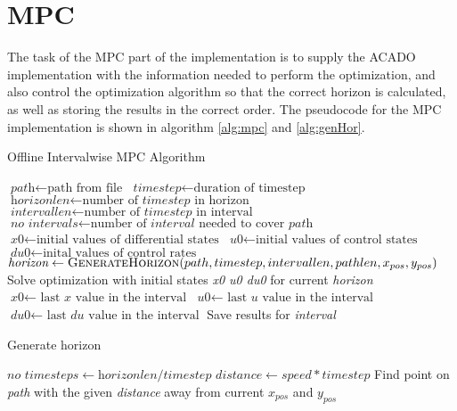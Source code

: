 \section{MPC}

The task of the MPC part of the implementation is to supply the ACADO implementation with the information needed to perform the optimization, and also control the optimization algorithm so that the correct horizon is calculated, as well as storing the results in the correct order. The pseudocode for the MPC implementation is shown in algorithm \ref{alg:mpc} and \ref{alg:genHor}.

\begin{algorithm}
\caption{Offline Intervalwise MPC Algorithm}
\label{alg:mpc}
\begin{algorithmic}
	\State $\textit{path} \gets \text{path from file}$
	\State $\textit{timestep} \gets \text{duration of timestep}$
	\State $\textit{horizonlen} \gets \text{number of } \textit{timestep} \text{ in horizon}$
	\State $\textit{intervallen} \gets \text{number of } \textit{timestep} \text{ in interval}$
	\State $\textit{no intervals} \gets \text{number of } \textit{interval} \text{ needed to cover } \textit{path}$
	\State $\textit{x0} \gets \text{initial values of differential states}$
	\State $\textit{u0} \gets \text{initial values of control states}$
	\State $\textit{du0} \gets \text{inital values of control rates}$
		\State $\textit{horizon} \gets \Call{GenerateHorizon}{path, timestep, intervallen, pathlen, x_{pos}, y_{pos}}$
		\State Solve optimization with initial states \textit{x0 u0 du0} for current \textit{horizon}
		\State $\textit{x0} \gets \text{ last } \textit{x} \text{ value in the interval}$
		\State $\textit{u0} \gets \text{ last } \textit{u} \text{ value in the interval}$
		\State $\textit{du0} \gets \text{ last } \textit{du} \text{ value in the interval}$
		\State Save results for \textit{interval}
	\EndFor
\EndProcedure
\end{algorithmic}
\end{algorithm}

\begin{algorithm}
\caption{Generate horizon}
\label{alg:genHor}
\begin{algorithmic}
	\State $\textit{no timesteps} \gets \textit{horizonlen}/\textit{timestep}$
	\State $\textit{distance} \gets \textit{speed} * \textit{timestep}$
		Find point on \textit{path} with the given \textit{distance} away from current \textit{$x_{pos}$} and \textit{$y_{pos}$}
	\EndFor
\EndProcedure
\end{algorithmic}
\end{algorithm}